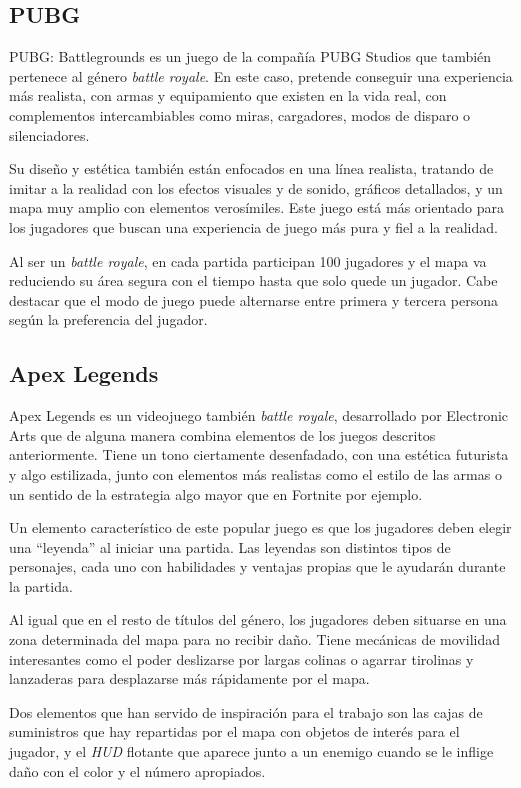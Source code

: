 \subsection{PUBG}
PUBG: Battlegrounds es un juego de la compañía PUBG Studios que también pertenece al género \textit{battle royale}. En este caso, pretende conseguir una experiencia más realista, con armas y equipamiento que existen en la vida real, con complementos intercambiables como miras, cargadores, modos de disparo o silenciadores.

Su diseño y estética también están enfocados en una línea realista, tratando de imitar a la realidad con los efectos visuales y de sonido, gráficos detallados, y un mapa muy amplio con elementos verosímiles. Este juego está más orientado para los jugadores que buscan una experiencia de juego más pura y fiel a la realidad.

Al ser un \textit{battle royale}, en cada partida participan 100 jugadores y el mapa va reduciendo su área segura con el tiempo hasta que solo quede un jugador.
Cabe destacar que el modo de juego puede alternarse entre primera y tercera persona según la preferencia del jugador.

\subsection{Apex Legends}
Apex Legends es un videojuego también \textit{battle royale}, desarrollado por Electronic Arts que de alguna manera combina elementos de los juegos descritos anteriormente. Tiene un tono ciertamente desenfadado, con una estética futurista y algo estilizada, junto con elementos más realistas como el estilo de las armas o un sentido de la estrategia algo mayor que en Fortnite por ejemplo.

Un elemento característico de este popular juego es que los jugadores deben elegir una ``leyenda'' al iniciar una partida. Las leyendas son distintos tipos de personajes, cada uno con habilidades y ventajas propias que le ayudarán durante la partida.

Al igual que en el resto de títulos del género, los jugadores deben situarse en una zona determinada del mapa para no recibir daño. Tiene mecánicas de movilidad interesantes como el poder deslizarse por largas colinas o agarrar tirolinas y lanzaderas para desplazarse más rápidamente por el mapa.

Dos elementos que han servido de inspiración para el trabajo son las cajas de suministros que hay repartidas por el mapa con objetos de interés para el jugador, y el \textit{HUD} flotante que aparece junto a un enemigo cuando se le inflige daño con el color y el número apropiados.

